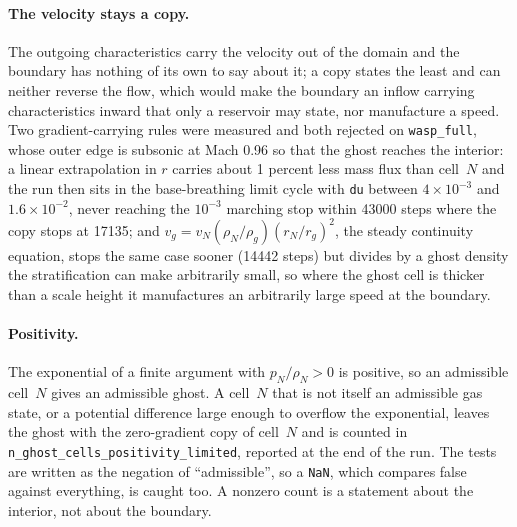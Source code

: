 \documentclass[english,a4paper]{my_memo}
\begin{document}
\paragraph{The velocity stays a copy.}
The outgoing characteristics carry the velocity out of the domain and the
boundary has nothing of its own to say about it; a copy states the least and
can neither reverse the flow, which would make the boundary an inflow
carrying characteristics inward that only a reservoir may state, nor
manufacture a speed. Two gradient-carrying rules were measured and both
rejected on \texttt{wasp\_full}, whose outer edge is subsonic at Mach 0.96 so
that the ghost reaches the interior: a linear extrapolation in $r$ carries
about 1 percent less mass flux than cell~$N$ and the run then sits in the
base-breathing limit cycle with \texttt{du} between $4\times10^{-3}$ and
$1.6\times10^{-2}$, never reaching the $10^{-3}$ marching stop within 43000
steps where the copy stops at 17135; and $v_g = v_N (\rho_N/\rho_g)
(r_N/r_g)^2$, the steady continuity equation, stops the same case sooner
(14442 steps) but divides by a ghost density the stratification can make
arbitrarily small, so where the ghost cell is thicker than a scale height it
manufactures an arbitrarily large speed at the boundary.

\paragraph{Positivity.}
The exponential of a finite argument with $p_N/\rho_N > 0$ is positive, so
an admissible cell~$N$ gives an admissible ghost. A cell~$N$ that is not
itself an admissible gas state, or a potential difference large enough to
overflow the exponential, leaves the ghost with the zero-gradient copy of
cell~$N$ and is counted in
\texttt{n\_ghost\_cells\_positivity\_limited}, reported at the end of the
run. The tests are written as the negation of ``admissible'', so a
\texttt{NaN}, which compares false against everything, is caught too. A
nonzero count is a statement about the interior, not about the boundary.
\end{document}
